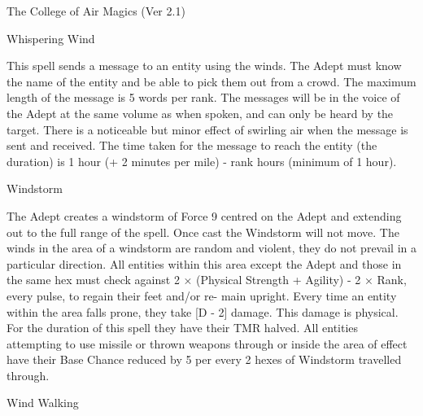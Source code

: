 \begin{Chapter}{The College of Air Magics (Ver 2.1)}
\begin{spell}[S-15]{Whispering Wind}

\begin{effects}
This spell sends a message to an entity using the winds. The Adept
must know the name of the entity and be able to pick them out from a
crowd.  The maximum length of the message is 5 words per rank. The
messages will be in the voice of the Adept at the same volume as when
spoken, and can only be heard by the target.  There is a noticeable
but minor effect of swirling air when the message is sent and
received.  The time taken for the message to reach the entity (the
duration) is 1 hour (+ 2 minutes per mile) - rank hours (minimum of 1
hour).
\end{effects}
\end{spell}

\begin{spell}[S-16]{Windstorm}

\begin{effects}
The Adept creates a windstorm of Force 9 centred on the Adept and
extending out to the full range of the spell.  Once cast the Windstorm
will not move. The winds in the area of a windstorm are random and
violent, they do not prevail in a particular direction. All entities
within this area except the Adept and those in the same hex must check
against 2 × (Physical Strength + Agility) - 2 × Rank, every pulse, to
regain their feet and/or re- main upright. Every time an entity within
the area falls prone, they take [D - 2] damage. This damage is
physical.  For the duration of this spell they have their TMR halved.
All entities attempting to use missile or thrown weapons through or
inside the area of effect have their Base Chance reduced by 5 per
every 2 hexes of Windstorm travelled through.
\end{effects}
\end{spell}

\begin{spell}[S-17]{Wind Walking}


\end{spell}
\end{Chapter}
